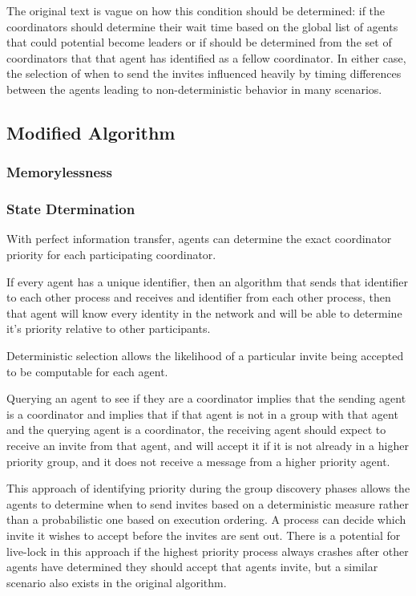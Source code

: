 The original text is vague on how this condition should be determined: if the coordinators should determine their wait time based on the global list of agents that could potential become leaders or if should be determined from the set of coordinators that that agent has identified as a fellow coordinator. In either case, the selection of when to send the invites influenced heavily by timing differences between the agents leading to non-deterministic behavior in many scenarios.

\subsection{Modified Algorithm}

\subsubsection{Memorylessness}

\subsubsection{State Dtermination}

\begin{thm}
With perfect information transfer, agents can determine the exact coordinator priority for each participating coordinator.
\end{thm}

If every agent has a unique identifier, then an algorithm that sends that identifier to each other process and receives and identifier from each other process, then that agent will know every identity in the network and will be able to determine it's priority relative to other participants.

\begin{thm}
Deterministic selection allows the likelihood of a particular invite being accepted to be computable for each agent.
\end{thm}

Querying an agent to see if they are a coordinator implies that the sending agent is a coordinator and implies that if that agent is not in a group with that agent and the querying agent is a coordinator, the receiving agent should expect to receive an invite from that agent, and will accept it if it is not already in a higher priority group, and it does not receive a message from a higher priority agent.

This approach of identifying priority during the group discovery phases allows the agents to determine when to send invites based on a deterministic measure rather than a probabilistic one based on execution ordering. A process can decide which invite it wishes to accept before the invites are sent out. There is a potential for live-lock in this approach if the highest priority process always crashes after other agents have determined they should accept that agents invite, but a similar scenario also exists in the original algorithm.

